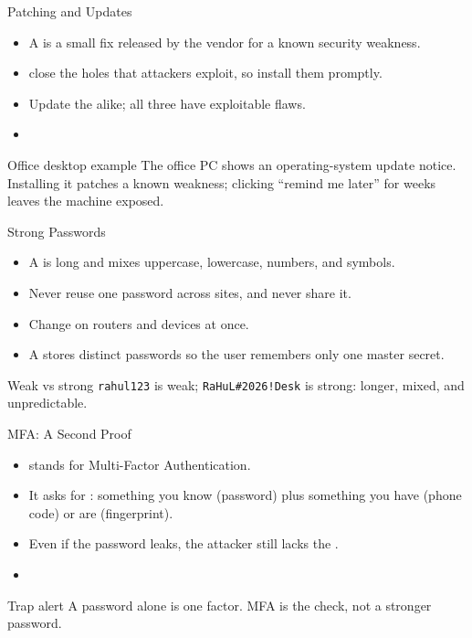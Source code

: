 \documentclass[aspectratio=169]{beamer}
\begin{document}
\begin{frame}{Patching and Updates}
  \begin{itemize}
    \item A  is a small fix released by the vendor for a known
      security weakness.
    \item {} close the holes that attackers exploit, so
      install them promptly.
    \item Update the  alike;
      all three have exploitable flaws.
    \item {}
  \end{itemize}
  \begin{exampleblock}{Office desktop example}
    The office PC shows an operating-system update notice. Installing it
    patches a known weakness; clicking ``remind me later'' for weeks leaves
    the machine exposed.
  \end{exampleblock}
\end{frame}

\begin{frame}{Strong Passwords}
  \begin{itemize}
    \item A  is long and mixes uppercase, lowercase,
      numbers, and symbols.
    \item Never reuse one password across sites, and never share it.
    \item Change  on routers and devices at once.
    \item A  stores distinct passwords so the user
      remembers only one master secret.
  \end{itemize}
  \begin{block}{Weak vs strong}
    \texttt{rahul123} is weak; \texttt{RaHuL\#2026!Desk} is strong: longer,
    mixed, and unpredictable.
  \end{block}
\end{frame}

\begin{frame}{MFA: A Second Proof}
  \begin{itemize}
    \item {} stands for Multi-Factor Authentication.
    \item It asks for : something you know (password)
      plus something you have (phone code) or are (fingerprint).
    \item Even if the password leaks, the attacker still lacks the
      .
    \item {}
  \end{itemize}
  \begin{alertblock}{Trap alert}
    A password alone is one factor. MFA is the  check, not a
    stronger password.
  \end{alertblock}
\end{frame}
\end{document}
